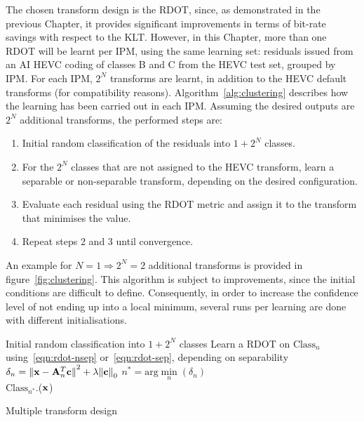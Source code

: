 \documentclass[11pt,a4paper,openright,twoside]{book}
\numberwithin{equation}{section} %
\numberwithin{figure}{section} %
\numberwithin{table}{section} %
\begin{document}
The chosen transform design is the \ac{RDOT}, since, as demonstrated in the
previous Chapter, it provides significant improvements in terms of bit-rate
savings with respect to the \ac{KLT}.
However, in this Chapter, more than one \ac{RDOT} will be learnt per \ac{IPM},
using the same learning set:
residuals issued from an \ac{AI} \ac{HEVC} coding of classes B and C from the
\ac{HEVC} test set, grouped by \ac{IPM}.
For each \ac{IPM}, $2^N$ transforms are learnt, in addition to the \ac{HEVC}
default transforms (for compatibility reasons).
Algorithm~\ref{alg:clustering} describes how the learning has been carried out
in each \ac{IPM}.
Assuming the desired outputs are $2^N$ additional transforms, the performed
steps are:
\begin{enumerate}
	\item Initial random classification of the residuals into $1+2^N$ classes.
	\item For the $2^N$ classes that are not assigned to the \ac{HEVC}
		transform, learn a separable or non-separable transform, depending on
		the desired configuration.
	\item Evaluate each residual using the \ac{RDOT} metric and assign it to
		the transform that minimises the value.
	\item Repeat steps 2 and 3 until convergence.
\end{enumerate}
An example for $N=1\Rightarrow2^N=2$ additional transforms is provided in
figure~\ref{fig:clustering}.
This algorithm is subject to improvements, since the initial conditions are
difficult to define.
Consequently, in order to increase the confidence level of not ending up into
a local minimum, several runs per learning are done with different
initialisations.

\begin{algorithm}
	\small
	\BlankLine%
	Initial random classification into $1+2^N$ classes
	\BlankLine%
	{
			{
				Learn a \ac{RDOT} on $\text{Class}_n$
				using~\eqref{eqn:rdot-nsep} or~\eqref{eqn:rdot-sep}, depending
				on separability
			}
			{
				{
					$\delta_n =
					{\Vert \mathbf{x} - \mathbf{A}^T_n\mathbf{c}\Vert}^2 + \lambda{\Vert\mathbf{c}\Vert}_0$
				}
				$\displaystyle n^* = \text{arg}\min\limits_n(\delta_n)$\\
				$\text{Class}_{n^*}$.\append($\mathbf{x}$)
			}
	}
	\caption{Multiple transform design}
	\label{alg:clustering}
\end{algorithm}
\end{document}
